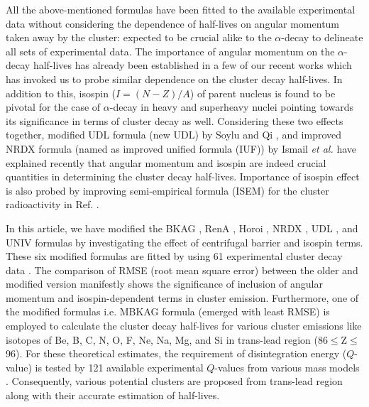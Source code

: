 \documentclass[preprint,10pt]{elsarticle}
\begin{document}
All the above-mentioned formulas have been fitted to the available experimental data without considering the dependence of half-lives on angular momentum taken away by the cluster: expected to be crucial alike to the $\alpha$-decay \cite{Denisov2009} to delineate all sets of experimental data. The importance of angular momentum on the $\alpha$-decay half-lives has already been established in a few of our recent works \cite{saxenaQF,pksharma2021} which has invoked us to probe similar dependence on the cluster decay half-lives. In addition to this, isospin ($I=(N-Z)/A$) of parent nucleus is found to be pivotal for the case of $\alpha$-decay in heavy and superheavy nuclei \cite{pksharma2021,saxenaJPG,Singh2021,Soylu2018,Akrawy2019,akrawy2022EPJA} pointing towards its significance in terms of cluster decay as well. Considering these two effects together, modified UDL formula (new UDL) by Soylu and Qi \cite{Soylu2021}, and improved NRDX formula (named as improved unified formula (IUF)) by Ismail \textit{et al.} \cite{Ismail2022} have explained recently that angular momentum and isospin are indeed crucial quantities in determining the cluster decay half-lives.
Importance of isospin effect is also probed by improving semi-empirical formula (ISEM) for the cluster radioactivity in Ref. \cite{cheng2022}. \par

In this article, we have modified the BKAG \cite{balasubramaniam2004}, RenA \cite{rena2004}, Horoi \cite{horoi2004}, NRDX \cite{nrdx2008}, UDL \cite{udl2009}, and UNIV \cite{univ2011} formulas by investigating the effect of centrifugal barrier and isospin terms. These six modified formulas are fitted by using 61 experimental cluster decay data \cite{Bonetti2007,Price1989,Royer2001,Soylu2021}. The comparison of RMSE (root mean square error) between the older and modified version manifestly shows the significance of inclusion of angular momentum and isospin-dependent terms in cluster emission. Furthermore, one of the modified formulas i.e. MBKAG formula (emerged with least RMSE) is employed to calculate the cluster decay half-lives for various cluster emissions like isotopes of Be, B, C, N, O, F, Ne, Na, Mg, and Si in trans-lead region (86$\leq$Z$\leq$96). For these theoretical estimates, the requirement of disintegration energy ($Q$-value) is tested by 121 available experimental $Q$-values \cite{Bonetti2007,Price1989,Royer2001,Soylu2021} from  various mass models \cite{ws42014,moller2019,Singh2012,hfb2004}. Consequently, various potential clusters are proposed from trans-lead region along with their accurate estimation of half-lives. \par
\end{document}
